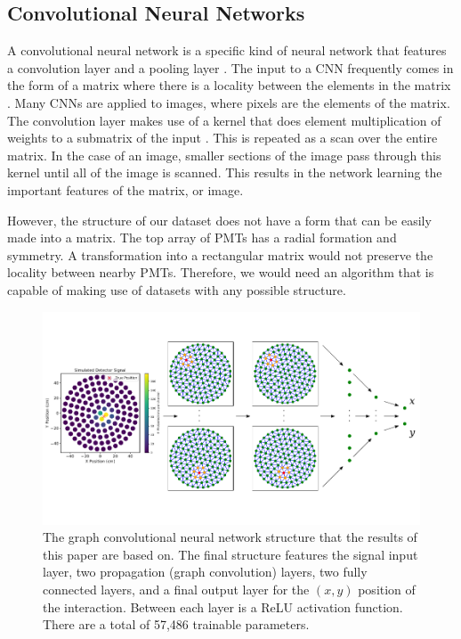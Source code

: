 \documentclass[../thesis.tex]{subfiles}
\begin{document}
\subsection{Convolutional Neural Networks}\label{subsec:CNN}
A convolutional neural network is a specific kind of neural network that features a convolution layer and a pooling layer \cite{deep-learning}.
The input to a CNN frequently comes in the form of a matrix where there is a locality between the elements in the matrix \cite{deep-learning}.
Many CNNs are applied to images, where pixels are the elements of the matrix.
The convolution layer makes use of a kernel that does element multiplication of weights to a submatrix of the input \cite{deep-learning}.
This is repeated as a scan over the entire matrix.
In the case of an image, smaller sections of the image pass through this kernel until all of the image is scanned.
This results in the network learning the important features of the matrix, or image.

\par However, the structure of our dataset does not have a form that can be easily made into a matrix.
The top array of PMTs has a radial formation and symmetry.
A transformation into a rectangular matrix would not preserve the locality between nearby PMTs.
Therefore, we would need an algorithm that is capable of making use of datasets with any possible structure.
\begin{figure}[t]
	\centering
	\includegraphics[width=\linewidth]{figures/gcnn_architecture.pdf}
	\caption{
	The graph convolutional neural network structure that the results of this paper are based on.
	The final structure features the signal input layer, two propagation (graph convolution) layers, two fully connected layers, and a final output layer for the $(x,y)$ position of the interaction.
	Between each layer is a ReLU activation function.
	There are a total of 57,486 trainable parameters.
	}
	\label{fig:figures/GCNN_Structure}
\end{figure}
\end{document}
